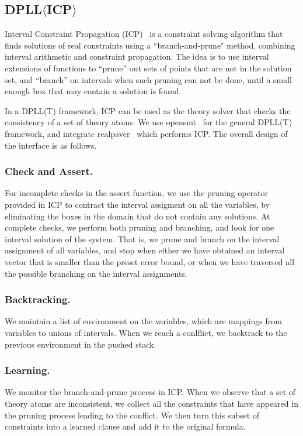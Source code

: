 \documentclass[envcountsect]{llncs}
\begin{document}
\subsection{DPLL$\langle$ICP$\rangle$}

Interval Constraint Propagation (ICP)~\cite{handbookICP} is a constraint solving
algorithm that finds
solutions of real constraints using a ``branch-and-prune" method, combining
interval arithmetic and constraint propagation. The idea is to use interval
extensions of functions to ``prune'' out sets of points that are not in the
solution set, and ``branch'' on intervals when such pruning can not be done,
until a small enough box that may contain a solution is found.

In a DPLL(T) framework, ICP can be used as the theory solver that checks the
consistency of a set of theory atoms. We use {\sf opensmt}~\cite{} for the
general
DPLL(T) framework, and integrate {\sf realpaver}~\cite{} which performs ICP. The
overall design of the interface is as follows.
\subsubsection{Check and Assert.} For incomplete checks in the assert function,
we use the pruning operator provided in ICP to contract the interval assigment
on all the variables, by eliminating the boxes in the domain that do not contain
any solutions. At complete checks, we perform both pruning and branching, and
look for one interval solution of the system. That is, we prune and branch on
the interval assignment of all variables, and stop when either we have obtained
an interval vector that is smaller than the preset error bound, or when we have
traversed all the possible branching on the interval assignments.
\subsubsection{Backtracking.} We maintain a list of environment on the variables,
which are mappings from variables to unions of intervals. When we reach a
conlflict, we backtrack to the previous environment in the pushed stack.
\subsubsection{Learning.} We monitor the branch-and-prune process in ICP.
When we observe that a set of theory atoms are inconsistent, we collect all the
constraints that have appeared in the pruning process leading to the conflict.
We then turn this subset of constraints into a learned clause and add it to the
original formula.
\end{document}
